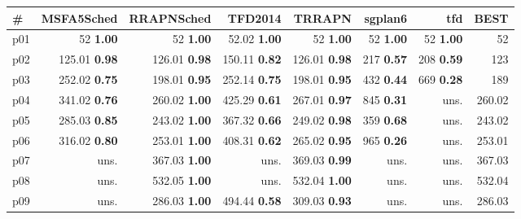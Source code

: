 \begin{tabular}{lrrrrrrr}
\toprule
\textbf{\#} & \textbf{MSFA5Sched} & \textbf{RRAPNSched} & \textbf{TFD2014} & \textbf{TRRAPN} & \textbf{sgplan6} & \textbf{tfd} & \textbf{BEST}\\
\midrule
\multicolumn{1}{l|}{p01} & {\footnotesize 52} \textbf{1.00} & {\footnotesize 52} \textbf{1.00} & {\footnotesize 52.02} \textbf{1.00} & {\footnotesize 52} \textbf{1.00} & {\footnotesize 52} \textbf{1.00} & {\footnotesize 52} \textbf{1.00} & \multicolumn{1}{|r}{52}\\
\multicolumn{1}{l|}{p02} & {\footnotesize 125.01} \textbf{0.98} & {\footnotesize 126.01} \textbf{0.98} & {\footnotesize 150.11} \textbf{0.82} & {\footnotesize 126.01} \textbf{0.98} & {\footnotesize 217} \textbf{0.57} & {\footnotesize 208} \textbf{0.59} & \multicolumn{1}{|r}{123}\\
\multicolumn{1}{l|}{p03} & {\footnotesize 252.02} \textbf{0.75} & {\footnotesize 198.01} \textbf{0.95} & {\footnotesize 252.14} \textbf{0.75} & {\footnotesize 198.01} \textbf{0.95} & {\footnotesize 432} \textbf{0.44} & {\footnotesize 669} \textbf{0.28} & \multicolumn{1}{|r}{189}\\
\multicolumn{1}{l|}{p04} & {\footnotesize 341.02} \textbf{0.76} & {\footnotesize 260.02} \textbf{1.00} & {\footnotesize 425.29} \textbf{0.61} & {\footnotesize 267.01} \textbf{0.97} & {\footnotesize 845} \textbf{0.31} & uns. & \multicolumn{1}{|r}{260.02}\\
\multicolumn{1}{l|}{p05} & {\footnotesize 285.03} \textbf{0.85} & {\footnotesize 243.02} \textbf{1.00} & {\footnotesize 367.32} \textbf{0.66} & {\footnotesize 249.02} \textbf{0.98} & {\footnotesize 359} \textbf{0.68} & uns. & \multicolumn{1}{|r}{243.02}\\
\multicolumn{1}{l|}{p06} & {\footnotesize 316.02} \textbf{0.80} & {\footnotesize 253.01} \textbf{1.00} & {\footnotesize 408.31} \textbf{0.62} & {\footnotesize 265.02} \textbf{0.95} & {\footnotesize 965} \textbf{0.26} & uns. & \multicolumn{1}{|r}{253.01}\\
\multicolumn{1}{l|}{p07} & uns. & {\footnotesize 367.03} \textbf{1.00} & uns. & {\footnotesize 369.03} \textbf{0.99} & uns. & uns. & \multicolumn{1}{|r}{367.03}\\
\multicolumn{1}{l|}{p08} & uns. & {\footnotesize 532.05} \textbf{1.00} & uns. & {\footnotesize 532.04} \textbf{1.00} & uns. & uns. & \multicolumn{1}{|r}{532.04}\\
\multicolumn{1}{l|}{p09} & uns. & {\footnotesize 286.03} \textbf{1.00} & {\footnotesize 494.44} \textbf{0.58} & {\footnotesize 309.03} \textbf{0.93} & uns. & uns. & \multicolumn{1}{|r}{286.03}\\

\end{tabular}

